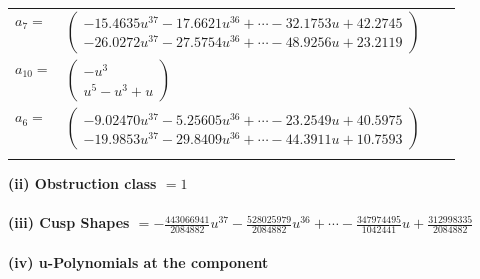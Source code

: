 \documentclass[1p]{elsarticle_modified}
\theoremstyle{definition}
\begin{document}
\begin{tabular}{m{7pt} m{180pt} m{7pt} m{180pt} }
\flushright $a_{7}=$&$\begin{pmatrix}-15.4635 u^{37}-17.6621 u^{36}+\cdots-32.1753 u+42.2745\\-26.0272 u^{37}-27.5754 u^{36}+\cdots-48.9256 u+23.2119\end{pmatrix}$ \\
\flushright $a_{10}=$&$\begin{pmatrix}- u^3\\u^5- u^3+u\end{pmatrix}$ \\
\flushright $a_{6}=$&$\begin{pmatrix}-9.02470 u^{37}-5.25605 u^{36}+\cdots-23.2549 u+40.5975\\-19.9853 u^{37}-29.8409 u^{36}+\cdots-44.3911 u+10.7593\end{pmatrix}$\\&\end{tabular}
\flushleft \textbf{(ii) Obstruction class $= 1$}\\~\\
\flushleft \textbf{(iii) Cusp Shapes $= -\frac{443066941}{2084882} u^{37}-\frac{528025979}{2084882} u^{36}+\cdots-\frac{347974495}{1042441} u+\frac{312998335}{2084882}$}\\~\\
\newpage\renewcommand{\arraystretch}{1}
\flushleft \textbf{(iv) u-Polynomials at the component}\newline \\
\end{document}
